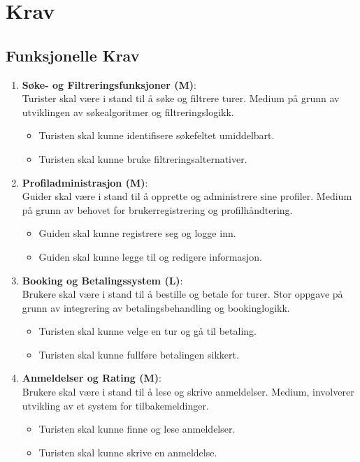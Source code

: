\documentclass[../doc.tex]{subfiles}
\begin{document}
\section{Krav}
\subsection{Funksjonelle Krav}
\begin{enumerate}
    \item \textbf{Søke- og Filtreringsfunksjoner (M)}: \\
    Turister skal være i stand til å søke og filtrere turer. Medium på grunn av utviklingen av søkealgoritmer og filtreringslogikk.
    \begin{itemize}
        \item Turisten skal kunne identifisere søkefeltet umiddelbart.
        \item Turisten skal kunne bruke filtreringsalternativer.
    \end{itemize}

    \item \textbf{Profiladministrasjon (M)}: \\
    Guider skal være i stand til å opprette og administrere sine profiler. Medium på grunn av behovet for brukerregistrering og profilhåndtering.
    \begin{itemize}
        \item Guiden skal kunne registrere seg og logge inn.
        \item Guiden skal kunne legge til og redigere informasjon.
    \end{itemize}

    \item \textbf{Booking og Betalingssystem (L)}: \\
    Brukere skal være i stand til å bestille og betale for turer. Stor oppgave på grunn av integrering av betalingsbehandling og bookinglogikk.
    \begin{itemize}
        \item Turisten skal kunne velge en tur og gå til betaling.
        \item Turisten skal kunne fullføre betalingen sikkert.
    \end{itemize}

    \item \textbf{Anmeldelser og Rating (M)}: \\
    Brukere skal være i stand til å lese og skrive anmeldelser. Medium, involverer utvikling av et system for tilbakemeldinger.
    \begin{itemize}
        \item Turisten skal kunne finne og lese anmeldelser.
        \item Turisten skal kunne skrive en anmeldelse.
    \end{itemize}


\end{enumerate}
\end{document}
